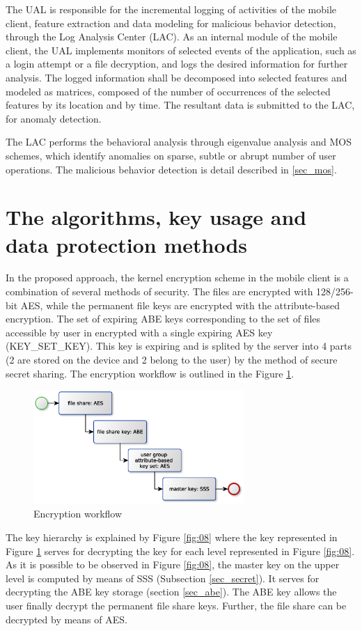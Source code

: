 \documentclass[twocolumn]{svjour3}          	%
\begin{document}
The UAL is responsible for the incremental logging of activities of the mobile client, feature extraction and data modeling for malicious behavior detection, through the Log Analysis Center (LAC). As an internal module of the mobile client, the UAL implements monitors of selected events of the application, such as a login attempt or a file decryption, and logs the desired information for further analysis. The logged information shall be decomposed into selected features and modeled as matrices, composed of the number of occurrences of the selected features by its location and by time. The resultant data is submitted to the LAC, for anomaly detection.

The LAC performs the behavioral analysis through eigenvalue analysis and MOS schemes, which identify anomalies on sparse, subtle or abrupt number of user operations. The malicious behavior detection is detail described in \ref{sec_mos}.

\section{The algorithms, key usage and data protection methods}
\label{sec_algorithms}
In the proposed approach, the kernel encryption scheme in the mobile client is a combination of several methods of security. The files are encrypted with 128/256-bit AES, while the permanent file keys are encrypted with the attribute-based encryption. The set of expiring ABE keys corresponding to the set of files accessible by user in encrypted with a single expiring AES key (KEY\_SET\_KEY). This key is expiring and is splited by the server into 4 parts (2 are stored on the device and 2 belong to the user) by the method of secure secret sharing. The encryption workflow is outlined in the Figure \ref{fig:07}.

\begin{figure}[h!]
	\centering
	\includegraphics[width=8cm]{fig07.eps}
	\caption{Encryption workflow}
	\label{fig:07}
\end{figure}

The key hierarchy is explained by Figure \ref{fig:08} where the key represented in Figure \ref{fig:07} serves for decrypting the key for each level represented in Figure \ref{fig:08}. As it is possible to be observed in Figure \ref{fig:08}, the master key on the upper level is computed by means of SSS (Subsection \ref{sec_secret}). It serves for decrypting the ABE key storage (section \ref{sec_abe}). The ABE key allows the user finally decrypt the permanent file share keys. Further, the file share can be decrypted by means of AES.
\end{document}

